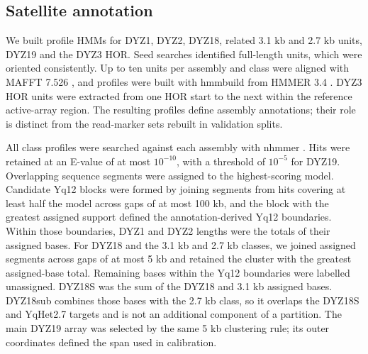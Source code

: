 \documentclass[pdflatex,sn-nature]{sn-jnl}
\newif\ifdraftnotes
\newcommand{\draftnote}[1]{\ifdraftnotes\par\smallskip{\noindent\color{draftink}\small\textbf{Author query:} #1\par}\smallskip\fi}
\begin{document}
\draftnote{Supply an accession and coordinate manifest, assembly and quality-call versions, and all per-array inclusion reasons. Verify implementation of the stated quality rule for each source. Cite the release 2 resource directly; the release 1 pangenome paper is not a substitute for this data version.}

\subsection{Satellite annotation}\label{sec:m-units}
We built profile HMMs for DYZ1, DYZ2, DYZ18, related 3.1 kb and 2.7 kb units, DYZ19 and the DYZ3 HOR. Seed searches identified full-length units, which were oriented consistently. Up to ten units per assembly and class were aligned with MAFFT 7.526 \cite{Katoh2013}, and profiles were built with hmmbuild from HMMER 3.4 \cite{Eddy2011}. DYZ3 HOR units were extracted from one HOR start to the next within the reference active-array region. The resulting profiles define assembly annotations; their role is distinct from the read-marker sets rebuilt in validation splits.

All class profiles were searched against each assembly with nhmmer \cite{Wheeler2013}. Hits were retained at an E-value of at most $10^{-10}$, with a threshold of $10^{-5}$ for DYZ19. Overlapping sequence segments were assigned to the highest-scoring model. Candidate Yq12 blocks were formed by joining segments from hits covering at least half the model across gaps of at most 100 kb, and the block with the greatest assigned support defined the annotation-derived Yq12 boundaries. Within those boundaries, DYZ1 and DYZ2 lengths were the totals of their assigned bases. For DYZ18 and the 3.1 kb and 2.7 kb classes, we joined assigned segments across gaps of at most 5 kb and retained the cluster with the greatest assigned-base total. Remaining bases within the Yq12 boundaries were labelled unassigned. DYZ18S was the sum of the DYZ18 and 3.1 kb assigned bases. DYZ18sub combines those bases with the 2.7 kb class, so it overlaps the DYZ18S and YqHet2.7 targets and is not an additional component of a partition. The main DYZ19 array was selected by the same 5 kb clustering rule; its outer coordinates defined the span used in calibration.

\draftnote{Record the seed accessions, final profile files, sampling seed and exact numbers of units. The DYZ1 seed provenance needs confirmation. Retain the distinction between the cluster's assigned-base total and its outer-coordinate span in all released tables.}
\end{document}
